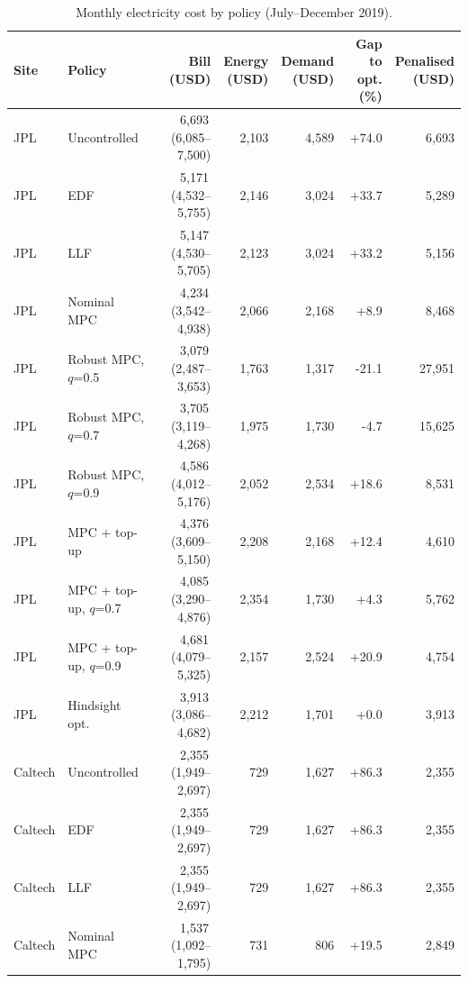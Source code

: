 \begin{table}[!htbp]
\centering
\caption{Monthly electricity cost by policy (July--December 2019).}
\label{tab:main}
\footnotesize
\setlength{\tabcolsep}{1.5pt}
\begin{tabular*}{\textwidth}{@{\extracolsep{\fill}}llrrrrr@{}}
\hline
Site & Policy & \makecell[c]{Bill\\(USD)} & \makecell[c]{Energy\\(USD)} & \makecell[c]{Demand\\(USD)} & \makecell[c]{Gap to\\opt. (\%)} & \makecell[c]{Penalised\\(USD)} \\
\hline
JPL & Uncontrolled & 6,693\,{\scriptsize(6,085--7,500)} & 2,103 & 4,589 & +74.0 & 6,693 \\
JPL & EDF & 5,171\,{\scriptsize(4,532--5,755)} & 2,146 & 3,024 & +33.7 & 5,289 \\
JPL & LLF & 5,147\,{\scriptsize(4,530--5,705)} & 2,123 & 3,024 & +33.2 & 5,156 \\
JPL & Nominal MPC & 4,234\,{\scriptsize(3,542--4,938)} & 2,066 & 2,168 & +8.9 & 8,468 \\
JPL & Robust MPC, $q$=0.5 & 3,079\,{\scriptsize(2,487--3,653)} & 1,763 & 1,317 & -21.1 & 27,951 \\
JPL & Robust MPC, $q$=0.7 & 3,705\,{\scriptsize(3,119--4,268)} & 1,975 & 1,730 & -4.7 & 15,625 \\
JPL & Robust MPC, $q$=0.9 & 4,586\,{\scriptsize(4,012--5,176)} & 2,052 & 2,534 & +18.6 & 8,531 \\
JPL & MPC + top-up & 4,376\,{\scriptsize(3,609--5,150)} & 2,208 & 2,168 & +12.4 & 4,610 \\
JPL & MPC + top-up, $q$=0.7 & 4,085\,{\scriptsize(3,290--4,876)} & 2,354 & 1,730 & +4.3 & 5,762 \\
JPL & MPC + top-up, $q$=0.9 & 4,681\,{\scriptsize(4,079--5,325)} & 2,157 & 2,524 & +20.9 & 4,754 \\
JPL & Hindsight opt. & 3,913\,{\scriptsize(3,086--4,682)} & 2,212 & 1,701 & +0.0 & 3,913 \\
\hline
Caltech & Uncontrolled & 2,355\,{\scriptsize(1,949--2,697)} & 729 & 1,627 & +86.3 & 2,355 \\
Caltech & EDF & 2,355\,{\scriptsize(1,949--2,697)} & 729 & 1,627 & +86.3 & 2,355 \\
Caltech & LLF & 2,355\,{\scriptsize(1,949--2,697)} & 729 & 1,627 & +86.3 & 2,355 \\
Caltech & Nominal MPC & 1,537\,{\scriptsize(1,092--1,795)} & 731 & 806 & +19.5 & 2,849 \\

\end{tabular*}
\end{table}
